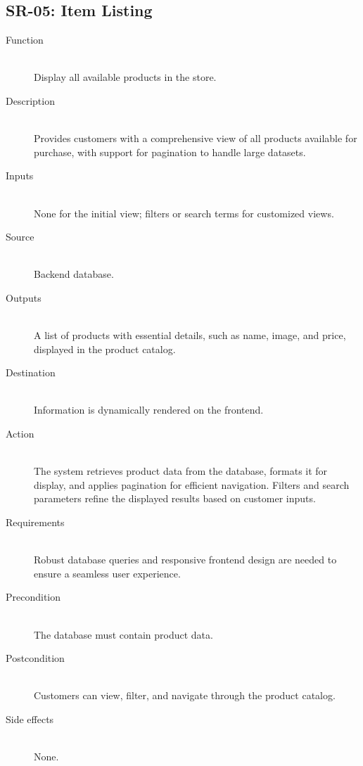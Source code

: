 \documentclass[twoside,a4paper,journal]{IEEEtran}
\begin{document}
\subsection{SR-05: Item Listing}
\begin{description}
  \item[Function] \hfill \\
    Display all
  available products in the store.
  \item[Description] \hfill \\
    Provides customers with a comprehensive view of all
  products available for purchase, with support for pagination to handle large
  datasets.
  \item[Inputs] \hfill \\
    None for the initial view; filters or search terms
  for customized views.
  \item[Source] \hfill \\
    Backend database.
  \item[Outputs] \hfill \\
    A list of products with essential details, such as
  name, image, and price, displayed in the product catalog.
  \item[Destination] \hfill \\
    Information is dynamically rendered on the frontend.
  \item[Action] \hfill \\
    The system retrieves product data from the database,
  formats it for display, and applies pagination for efficient navigation.
  Filters and search parameters refine the displayed results based on customer
  inputs.
  \item[Requirements] \hfill \\
    Robust database queries and responsive frontend
  design are needed to ensure a seamless user experience.
  \item[Precondition] \hfill \\
    The database must contain product data.
  \item[Postcondition] \hfill \\
    Customers can view, filter, and navigate through the
    product catalog.
  \item[Side effects] \hfill \\
    None.
\end{description}
\end{document}
